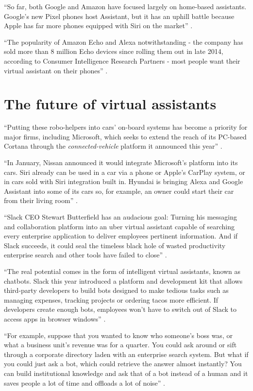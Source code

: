 ``So far, both Google and Amazon have focused largely on home-based assistants. Google's new Pixel phones host Assistant, but it has an uphill battle because Apple has far more phones equipped with Siri on the market'' \cite{Baron2017assistants}.

``The popularity of Amazon Echo and Alexa notwithstanding - the company has sold more than 8 million Echo devices since rolling them out in late 2014, according to Consumer Intelligence Research Partners - most people want their virtual assistant on their phones'' \cite{Baron2017assistants}. 

\section{The future of virtual assistants}
``Putting these robo-helpers into cars' on-board systems has become a priority for major firms, including Microsoft, which seeks to extend the reach of its PC-based Cortana through the {\em connected-vehicle} platform it announced this year'' \cite{Baron2017assistants}.

``In January, Nissan announced it would integrate Microsoft's platform into its cars. Siri already can be used in a car via a phone or Apple's CarPlay system, or in cars sold with Siri integration built in. Hyundai is bringing Alexa and Google Assistant into some of its cars so, for example, an owner could start their car from their living room'' \cite{Baron2017assistants}.

``Slack CEO Stewart Butterfield has an audacious goal: Turning his messaging and collaboration platform into an uber virtual assistant capable of searching every enterprise application to deliver employees pertinent information. And if Slack succeeds, it could seal the timeless black hole of wasted productivity enterprise search and other tools have failed to close'' \cite{Boulton2016assistants}.

``The real potential comes in the form of intelligent virtual assistants, known as chatbots. Slack this year introduced a platform and development kit that allows third-party developers to build bots designed to make tedious tasks such as managing expenses, tracking projects or ordering tacos more efficient. If developers create enough bots, employees won't have to switch out of Slack to access apps in browser windows'' \cite{Boulton2016assistants}.

``For example, suppose that you wanted to know who someone's boss was, or what a business unit's revenue was for a quarter. You could ask around or sift through a corporate directory laden with an enterprise search system. But what if you could just ask a bot, which could retrieve the answer almost instantly? You can build institutional knowledge and ask that of a bot instead of a human and it saves people a lot of time and offloads a lot of noise'' \cite{Boulton2016assistants}.

